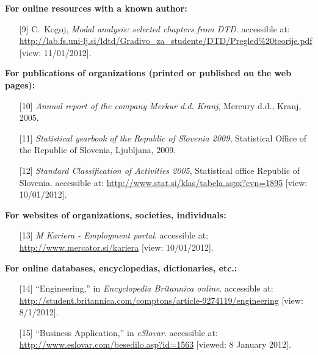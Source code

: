 \textbf{For online resources with a known author:}
\begin{itemize}
\item[{[9]}]C.~Kogoj, \emph{Modal analysis: selected chapters from {DTD}}.
accessible at:
\url{http://lab.fs.uni-lj.si/ldtd/Gradivo_za_studente/DTD/Pregled\%20teorije.pdf}
[view: 11/01/2012].
\end{itemize}

\textbf{For publications of organizations (printed or published on the web
pages):}
\begin{itemize}
\item[{[10]}] \emph{Annual report of the company {M}erkur d.d. {K}ranj}, {Mercury
d.d., Kranj}, 2005.\\

\item[{[11]}] \emph{{Statistical yearbook of the Republic of Slovenia 2009}},
Statistical Office of the Republic of Slovenia, Ljubljana, 2009.\\

\item[{[12]}]\emph{Standard Classification of Activities 2005}, {Statistical
office
Republic of Slovenia}. accessible at:
\url{http://www.stat.si/klas/tabela.aspx?cvn=1895}
[view: 10/01/2012].
\end{itemize}

\textbf{For websites of organizations, societies, individuals:}
\begin{itemize}
\item[{[13]}] \emph{M Kariera - Employment portal}. accessible at:
\url{http://www.mercator.si/kariera} [view: 10/01/2012].
\end{itemize}

\textbf{For online databases, encyclopedias, dictionaries, etc.:}
\begin{itemize}
\item[{[14]}] ``Engineering,'' in \emph{Encyclopedia Britannica online}.
accessible at:
\url{http://student.britannica.com/comptons/article-9274119/engineering}
[view: 8/1/2012].\\

\item[{[15]}] ``Business Application,'' in \emph{eSlovar}. accessible at:
\url{http://www.eslovar.com/besedilo.asp?id=1563} [viewed: 8 January 2012].
\end{itemize}

